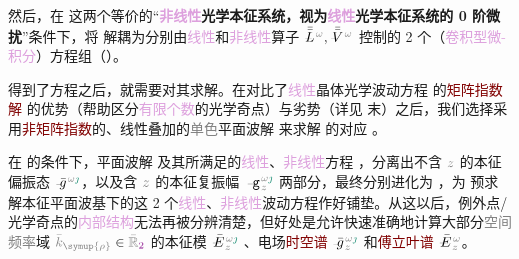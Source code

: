 然后，在  这两个等价的“\textbf{\textcolor{Plum}{非线性}\textcolor{NavyBlue}{光学}\textcolor{PineGreen}{本征系统}，视为\textcolor{Plum}{线性}\textcolor{NavyBlue}{光学}\textcolor{PineGreen}{本征系统}的 \textcolor{NavyBlue}{0 阶微扰}}”条件下，将  解耦为分别由\textcolor{Plum}{线性}和\textcolor{Plum}{非线性}算子 $\Xint{\mathcolor{gray}{-}}{30}{\bar{\bar{L}}}^{\;\! \mathcolor{gray}{\omega}},\Xint{\mathcolor{gray}{-}}{21}{\bar{\bar{V}}}^{\;\! \mathcolor{gray}{\omega}}$ 控制的 2 个（\textcolor{Plum}{卷积型微-积分}）方程组（）。

得到了方程之后，就需要对其求解。在对比了\textcolor{Plum}{线性}\textcolor{PineGreen}{晶体光学}波动方程  的\textcolor{Maroon}{矩阵指数解}  的优势（帮助区分\textcolor{Plum}{有限个数}的\textcolor{PineGreen}{光学奇点}）与劣势（详见  末）之后，我们选择采用\textcolor{Maroon}{非矩阵指数}的、\textcolor{PineGreen}{线性叠加}的\textcolor{gray}{单色}\textcolor{PineGreen}{平面波解}  来求解  的对应 。

在  的条件下，\textcolor{PineGreen}{平面波解}  及其所满足的\textcolor{Plum}{线性}、\textcolor{Plum}{非线性}方程 ，分离出不含 $\mathcolor{gray}{z}$ 的\textcolor{PineGreen}{本征偏振态} $\Xint{{}^{}_{\mathcolor{gray}{-}}}{10}{\bar{g}}^{\;\!\mathcolor{gray}{\omega} \textcolor{PineGreen}{\jmath}}$，以及含 $\mathcolor{gray}{z}$ 的\textcolor{PineGreen}{本征复振幅} $\Xint{\begin{smallmatrix} ~ \\ {}^{}_{\mathcolor{gray}{-}} \\ ~ \end{smallmatrix}}{09}{\mathtt{g}}^{\;\!\mathcolor{gray}{\omega} \textcolor{PineGreen}{\jmath}}_{\;\! \mathcolor{gray}{z}}$ 两部分，最终分别进化为 ，为  预求解\textcolor{PineGreen}{本征平面波基}下的这 2 个\textcolor{Plum}{线性}、\textcolor{Plum}{非线性}波动方程作好铺垫。从这以后，\textcolor{PineGreen}{例外点}/\textcolor{PineGreen}{光学奇点}的\textcolor{Plum}{内部结构}无法再被分辨清楚，但好处是允许快速准确地计算大部分\textcolor{gray}{空间频率}域 $\mathcolor{gray}{\bar{k}_{\symup{\rho}}} \in \mathcolor{gray}{\bar{\mathbb{R}}_{\textcolor{Plum}{2}}}$ 的\textcolor{PineGreen}{本征模} $\Xint{\mathcolor{gray}{-}}{25}{\bar{E}}^{\;\!\mathcolor{gray}{\omega} \textcolor{PineGreen}{\jmath}}_{\;\! \mathcolor{gray}{z}}$ 、电场\textcolor{Maroon}{时空谱} $\Xint{{}^{}_{\mathcolor{gray}{-}}}{10}{\bar{g}}^{\;\!\mathcolor{gray}{\omega} \textcolor{PineGreen}{\jmath}}_{\;\! \mathcolor{gray}{z}}$ 和\textcolor{Maroon}{傅立叶谱} $\Xint{\mathcolor{gray}{-}}{25}{\bar{E}}^{\;\!\mathcolor{gray}{\omega}}_{\;\! \mathcolor{gray}{z}}$。



